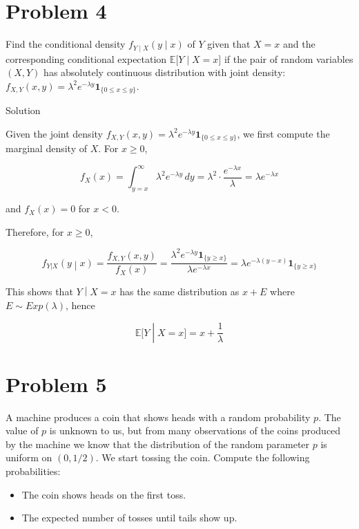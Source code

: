 \documentclass{qlnotes-export}
\begin{document}
\section{Problem 4}\label{problem-4-3}

Find the conditional density \(f_{Y \mid X}(y \mid x)\) of \(Y\) given that \(X = x\) and the corresponding conditional expectation \({\mathbb{E}}\lbrack Y \mid X = x\rbrack\) if the pair of random variables \((X,Y)\) has absolutely continuous distribution with joint density: \(f_{X,Y}(x,y) = \lambda^{2}e^{- \lambda y}\mathbf{1}_{\{{0 \leq x \leq y}\}}\).

\begin{qlsolution}{Solution}

Given the joint density \(f_{X,Y}(x,y) = \lambda^{2}e^{- \lambda y}\mathbf{1}_{\{{0 \leq x \leq y}\}}\), we first compute the marginal density of \(X\). For \(x \geq 0\),

\[f_{X}(x) = \int_{y = x}^{\infty}\lambda^{2}e^{- \lambda y}\, dy = \lambda^{2} \cdot \frac{e^{- \lambda x}}{\lambda} = \lambda e^{- \lambda x}\]

and \(f_{X}(x) = 0\) for \(x < 0\).

Therefore, for \(x \geq 0\),

\[\left. f_{Y|X}(y \middle| x) = \frac{f_{X,Y}(x,y)}{f_{X}(x)} = \frac{\lambda^{2}e^{- \lambda y}\mathbf{1}_{\{{y \geq x}\}}}{\lambda e^{- \lambda x}} = \lambda e^{- \lambda(y - x)}\mathbf{1}_{\{{y \geq x}\}} \right.\]

This shows that \(\left. Y \middle| X = x \right.\) has the same distribution as \(x + E\) where \(E \sim Exp(\lambda)\), hence

\[\left. {\mathbb{E}}\lbrack Y \middle| X = x\rbrack = x + \frac{1}{\lambda} \right.\]

\end{qlsolution}

\section{Problem 5}\label{problem-5-3}

A machine produces a coin that shows heads with a random probability \(p\). The value of \(p\) is unknown to us, but from many observations of the coins produced by the machine we know that the distribution of the random parameter \(p\) is uniform on \((0,1/2)\). We start tossing the coin. Compute the following probabilities:

\begin{itemize}
\item
  The coin shows heads on the first toss.
\item
  The expected number of tosses until tails show up.
\end{itemize}
\end{document}
